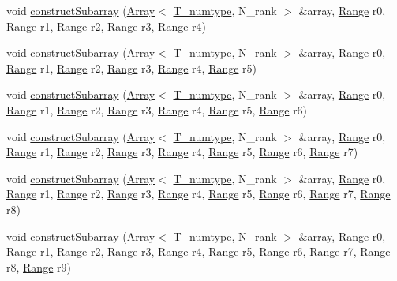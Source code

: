 \begin{DoxyCompactItemize}
\item 
void \hyperlink{classArray_aa889103322562994952493f34ebc9b06}{construct\+Subarray} (\hyperlink{classArray}{Array}$<$ \hyperlink{classArray_ae72770f4a1d2f8b7193badafc320f008}{T\+\_\+numtype}, N\+\_\+rank $>$ \&array, \hyperlink{classRange}{Range} r0, \hyperlink{classRange}{Range} r1, \hyperlink{classRange}{Range} r2, \hyperlink{classRange}{Range} r3, \hyperlink{classRange}{Range} r4)
\item 
void \hyperlink{classArray_a807246ff4783222419092567bd7d4e2c}{construct\+Subarray} (\hyperlink{classArray}{Array}$<$ \hyperlink{classArray_ae72770f4a1d2f8b7193badafc320f008}{T\+\_\+numtype}, N\+\_\+rank $>$ \&array, \hyperlink{classRange}{Range} r0, \hyperlink{classRange}{Range} r1, \hyperlink{classRange}{Range} r2, \hyperlink{classRange}{Range} r3, \hyperlink{classRange}{Range} r4, \hyperlink{classRange}{Range} r5)
\item 
void \hyperlink{classArray_a6e93846ab0e27f92fa469e4831a74636}{construct\+Subarray} (\hyperlink{classArray}{Array}$<$ \hyperlink{classArray_ae72770f4a1d2f8b7193badafc320f008}{T\+\_\+numtype}, N\+\_\+rank $>$ \&array, \hyperlink{classRange}{Range} r0, \hyperlink{classRange}{Range} r1, \hyperlink{classRange}{Range} r2, \hyperlink{classRange}{Range} r3, \hyperlink{classRange}{Range} r4, \hyperlink{classRange}{Range} r5, \hyperlink{classRange}{Range} r6)
\item 
void \hyperlink{classArray_af92fd8dba539c2fa6162b75a76bc8eed}{construct\+Subarray} (\hyperlink{classArray}{Array}$<$ \hyperlink{classArray_ae72770f4a1d2f8b7193badafc320f008}{T\+\_\+numtype}, N\+\_\+rank $>$ \&array, \hyperlink{classRange}{Range} r0, \hyperlink{classRange}{Range} r1, \hyperlink{classRange}{Range} r2, \hyperlink{classRange}{Range} r3, \hyperlink{classRange}{Range} r4, \hyperlink{classRange}{Range} r5, \hyperlink{classRange}{Range} r6, \hyperlink{classRange}{Range} r7)
\item 
void \hyperlink{classArray_a8bb2c309e6fda218580c38765c1ee8e2}{construct\+Subarray} (\hyperlink{classArray}{Array}$<$ \hyperlink{classArray_ae72770f4a1d2f8b7193badafc320f008}{T\+\_\+numtype}, N\+\_\+rank $>$ \&array, \hyperlink{classRange}{Range} r0, \hyperlink{classRange}{Range} r1, \hyperlink{classRange}{Range} r2, \hyperlink{classRange}{Range} r3, \hyperlink{classRange}{Range} r4, \hyperlink{classRange}{Range} r5, \hyperlink{classRange}{Range} r6, \hyperlink{classRange}{Range} r7, \hyperlink{classRange}{Range} r8)
\item 
void \hyperlink{classArray_a74ce196e56d8bd6c59621c19aebc1387}{construct\+Subarray} (\hyperlink{classArray}{Array}$<$ \hyperlink{classArray_ae72770f4a1d2f8b7193badafc320f008}{T\+\_\+numtype}, N\+\_\+rank $>$ \&array, \hyperlink{classRange}{Range} r0, \hyperlink{classRange}{Range} r1, \hyperlink{classRange}{Range} r2, \hyperlink{classRange}{Range} r3, \hyperlink{classRange}{Range} r4, \hyperlink{classRange}{Range} r5, \hyperlink{classRange}{Range} r6, \hyperlink{classRange}{Range} r7, \hyperlink{classRange}{Range} r8, \hyperlink{classRange}{Range} r9)

\end{DoxyCompactItemize}

